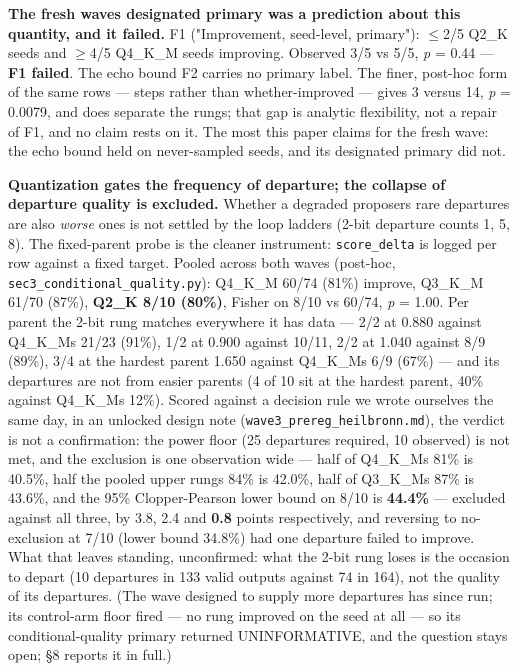 \textbf{The fresh wave\textquotesingle s designated primary was a prediction about this quantity, and it failed.} F1 ("Improvement, seed-level, primary"): \(\leq\)2/5 Q2\_K seeds and \(\geq\)4/5 Q4\_K\_M seeds improving. Observed 3/5 vs 5/5, \emph{p} = 0.44 --- \textbf{F1 failed}. The echo bound F2 carries no primary label. The finer, post-hoc form of the same rows --- steps rather than whether-improved --- gives 3 versus 14, \emph{p} = 0.0079, and does separate the rungs; that gap is analytic flexibility, not a repair of F1, and no claim rests on it. The most this paper claims for the fresh wave: the echo bound held on never-sampled seeds, and its designated primary did not.

\textbf{Quantization gates the frequency of departure; the collapse of departure quality is excluded.} Whether a degraded proposer\textquotesingle s rare departures are also \emph{worse} ones is not settled by the loop ladders (2-bit departure counts 1, 5, 8). The fixed-parent probe is the cleaner instrument: \texttt{score\_delta} is logged per row against a fixed target. Pooled across both waves (post-hoc, \texttt{sec3\_conditional\_quality.py}): Q4\_K\_M 60/74 (81\%) improve, Q3\_K\_M 61/70 (87\%), \textbf{Q2\_K 8/10 (80\%)}, Fisher on 8/10 vs 60/74, \emph{p} = 1.00. Per parent the 2-bit rung matches everywhere it has data --- 2/2 at 0.880 against Q4\_K\_M\textquotesingle s 21/23 (91\%), 1/2 at 0.900 against 10/11, 2/2 at 1.040 against 8/9 (89\%), 3/4 at the hardest parent 1.650 against Q4\_K\_M\textquotesingle s 6/9 (67\%) --- and its departures are not from easier parents (4 of 10 sit at the hardest parent, 40\% against Q4\_K\_M\textquotesingle s 12\%). Scored against a decision rule we wrote ourselves the same day, in an unlocked design note (\texttt{wave3\_prereg\_heilbronn.md}), the verdict is not a confirmation: the power floor (25 departures required, 10 observed) is not met, and the exclusion is one observation wide --- half of Q4\_K\_M\textquotesingle s 81\% is 40.5\%, half the pooled upper rungs\textquotesingle{} 84\% is 42.0\%, half of Q3\_K\_M\textquotesingle s 87\% is 43.6\%, and the 95\% Clopper-Pearson lower bound on 8/10 is \textbf{44.4\%} --- excluded against all three, by 3.8, 2.4 and \textbf{0.8} points respectively, and reversing to no-exclusion at 7/10 (lower bound 34.8\%) had one departure failed to improve. What that leaves standing, unconfirmed: what the 2-bit rung loses is the occasion to depart (10 departures in 133 valid outputs against 74 in 164), not the quality of its departures. (The wave designed to supply more departures has since run; its control-arm floor fired --- no rung improved on the seed at all --- so its conditional-quality primary returned UNINFORMATIVE, and the question stays open; §8 reports it in full.)

